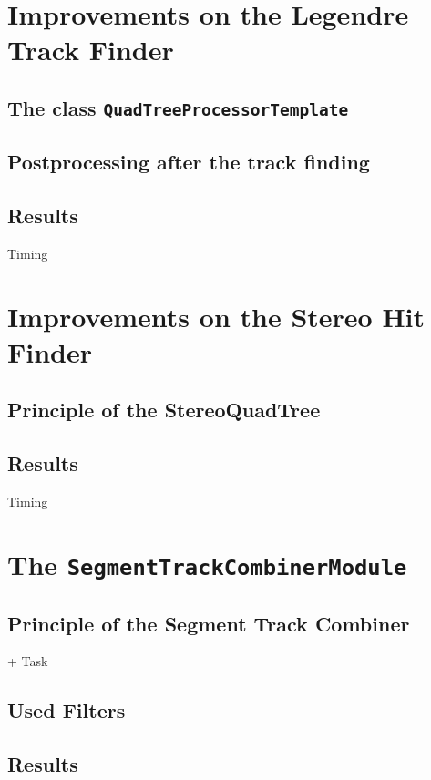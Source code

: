 \begin{figure}
  \caption{}
  \label{fig-result-background-hit-finder}
\end{figure}



\section{Improvements on the Legendre Track Finder}
\subsection{The class \texttt{QuadTreeProcessorTemplate}}
\subsection{Postprocessing after the track finding}
\subsection{Results}
Timing

\section{Improvements on the Stereo Hit Finder}
\subsection{Principle of the StereoQuadTree}
\subsection{Results}
Timing

\section{The \texttt{SegmentTrackCombinerModule}}
\subsection{Principle of the Segment Track Combiner}
+ Task
\subsection{Used Filters}
\subsection{Results}

